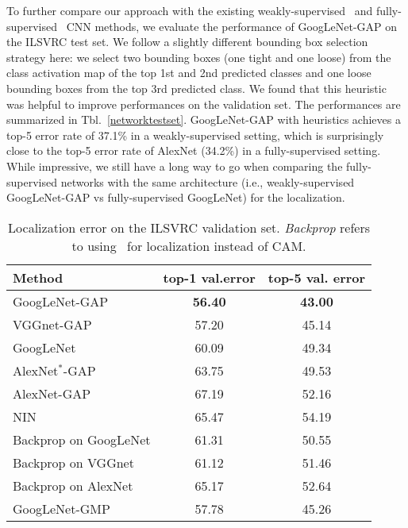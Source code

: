 \documentclass[10pt,twocolumn,letterpaper]{article}
\begin{document}
To further compare our approach with the existing weakly-supervised~\cite{simonyan2013deep} and fully-supervised~\cite{szegedy2014going,sermanet2013overfeat,szegedy2014going} CNN methods, we evaluate the performance of GoogLeNet-GAP on the ILSVRC test set. We follow a slightly different bounding box selection strategy here: we select two bounding boxes (one tight and one loose) from the class activation map of the top 1st and 2nd predicted classes and one loose bounding boxes from the top 3rd predicted class. We found that this heuristic was helpful to improve performances on the validation set. The performances are summarized in Tbl.~\ref{networktestset}. GoogLeNet-GAP with heuristics achieves a top-5 error rate of 37.1\% in a weakly-supervised setting, which is surprisingly close to the top-5 error rate of AlexNet (34.2\%) in a fully-supervised setting. While impressive, we still have a long way to go when comparing the fully-supervised networks with the same architecture (i.e., weakly-supervised GoogLeNet-GAP vs fully-supervised GoogLeNet) for the localization.


\begin{table}\caption{Localization error on the ILSVRC validation set. \textit{Backprop} refers to using~\cite{simonyan2013deep} for localization instead of CAM.}
\label{networkvalidationset}
\centering
\footnotesize
\begin{tabular}{ l | c | c }   
  \hline  
  \hline
  Method & top-1 val.error & top-5 val. error \\
    \hline  
  GoogLeNet-GAP&  \textbf{56.40} & \textbf{43.00} \\
  VGGnet-GAP& 57.20 & 45.14 \\
  GoogLeNet & 60.09 & 49.34\\      
  AlexNet$^{*}$-GAP & 63.75 & 49.53 \\     
  AlexNet-GAP & 67.19 & 52.16 \\
  NIN  & 65.47 & 54.19 \\
    \hline    
  Backprop on GoogLeNet & 61.31 & 50.55 \\  
  Backprop on VGGnet & 61.12 & 51.46 \\
  Backprop on AlexNet & 65.17 & 52.64 \\
  \hline  
    GoogLeNet-GMP  & 57.78 & 45.26 \\
    \hline 
\end{tabular}
\end{table}
\end{document}
